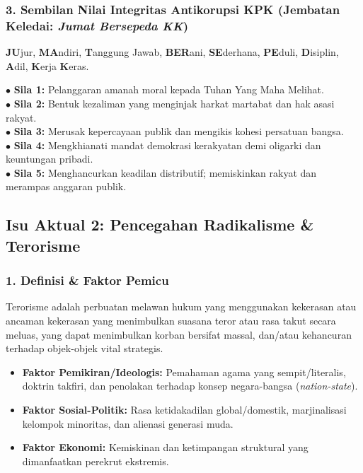\documentclass[10pt,a4paper]{article}
\begin{document}
\subsubsection{3. Sembilan Nilai Integritas Antikorupsi KPK (Jembatan Keledai: \textit{Jumat Bersepeda KK})}
\textbf{JU}jur, \textbf{MA}ndiri, \textbf{T}anggung Jawab, \textbf{BER}ani, \textbf{SE}derhana, \textbf{PE}duli, \textbf{D}isiplin, \textbf{A}dil, \textbf{K}erja \textbf{K}eras.
\begin{conceptbox}
$\bullet$ \textbf{Sila 1:} Pelanggaran amanah moral kepada Tuhan Yang Maha Melihat.\\
$\bullet$ \textbf{Sila 2:} Bentuk kezaliman yang menginjak harkat martabat dan hak asasi rakyat.\\
$\bullet$ \textbf{Sila 3:} Merusak kepercayaan publik dan mengikis kohesi persatuan bangsa.\\
$\bullet$ \textbf{Sila 4:} Mengkhianati mandat demokrasi kerakyatan demi oligarki dan keuntungan pribadi.\\
$\bullet$ \textbf{Sila 5:} Menghancurkan keadilan distributif; memiskinkan rakyat dan merampas anggaran publik.
\end{conceptbox}

\subsection{Isu Aktual 2: Pencegahan Radikalisme \& Terorisme}
\subsubsection{1. Definisi \& Faktor Pemicu}
Terorisme adalah perbuatan melawan hukum yang menggunakan kekerasan atau ancaman kekerasan yang menimbulkan suasana teror atau rasa takut secara meluas, yang dapat menimbulkan korban bersifat massal, dan/atau kehancuran terhadap objek-objek vital strategis.
\begin{itemize}
  \item \textbf{Faktor Pemikiran/Ideologis:} Pemahaman agama yang sempit/literalis, doktrin takfiri, dan penolakan terhadap konsep negara-bangsa (\textit{nation-state}).
  \item \textbf{Faktor Sosial-Politik:} Rasa ketidakadilan global/domestik, marjinalisasi kelompok minoritas, dan alienasi generasi muda.
  \item \textbf{Faktor Ekonomi:} Kemiskinan dan ketimpangan struktural yang dimanfaatkan perekrut ekstremis.
\end{itemize}
\end{document}
